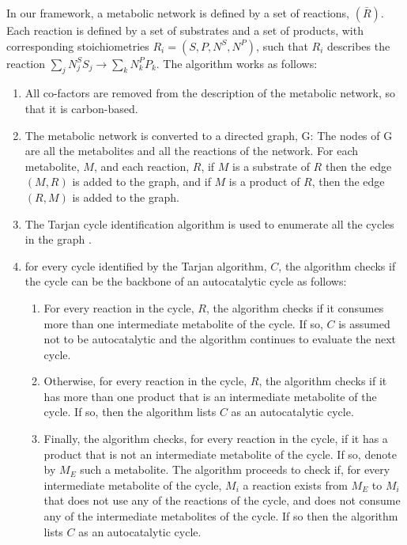   In our framework, a metabolic network is defined by a set of reactions, $(\bar{R})$.
  Each reaction is defined by a set of substrates and a set of products, with corresponding stoichiometries $R_i=(S,P,N^S,N^P)$, such that $R_i$ describes the reaction $\sum_j N_j^SS_j \rightarrow \sum_k N_k^PP_k$.
  The algorithm works as follows:
  \begin{enumerate}
    \item All co-factors are removed from the description of the metabolic network, so that it is carbon-based.
    \item The metabolic network is converted to a directed graph, G:
  The nodes of G are all the metabolites and all the reactions of the network.
  For each metabolite, $M$, and each reaction, $R$, if $M$ is a substrate of $R$ then the edge $(M,R)$ is added to the graph, and if $M$ is a product of $R$, then the edge $(R,M)$ is added to the graph.
    \item The Tarjan cycle identification algorithm is used to enumerate all the cycles in the graph \cite{Tarjan1973-gn}.
    \item for every cycle identified by the Tarjan algorithm, $C$, the algorithm checks if the cycle can be the backbone of an autocatalytic cycle as follows:
        \begin{enumerate}
            \item For every reaction in the cycle, $R$, the algorithm checks if it consumes more than one  intermediate metabolite of the cycle.
              If so, $C$ is assumed not to be autocatalytic and the algorithm continues to evaluate the next cycle.
            \item Otherwise, for every reaction in the cycle, $R$, the algorithm checks if it has more than one product that is an intermediate metabolite of the cycle.
              If so, then the algorithm lists $C$ as an autocatalytic cycle.
            \item Finally, the algorithm checks, for every reaction in the cycle, if it has a product that is not an intermediate metabolite of the cycle.
                If so, denote by $M_E$ such a metabolite.
            The algorithm proceeds to check if, for every intermediate metabolite of the cycle, $M_i$ a reaction exists from $M_E$ to $M_i$ that does not use any of the reactions of the cycle, and does not consume any of the intermediate metabolites of the cycle.
            If so then the algorithm lists $C$ as an autocatalytic cycle.
        \end{enumerate}
  \end{enumerate}

